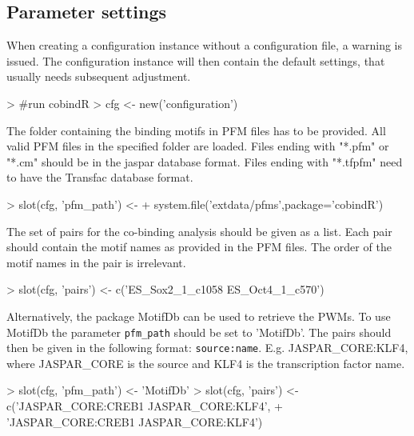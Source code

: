 \documentclass{article}
\begin{document}
\subsection*{Parameter settings}
When creating a configuration instance without a configuration file, a warning is issued. The configuration instance will then contain the default settings, that usually needs subsequent adjustment.

\begin{Schunk}
\begin{Sinput}
> #run cobindR
> cfg <- new('configuration')
\end{Sinput}
\end{Schunk}

The folder containing the binding motifs in PFM files has to be provided. All valid PFM files in the specified folder are loaded. Files ending with "*.pfm" or "*.cm" should be in the jaspar database format. Files ending with "*.tfpfm" need to have the Transfac database format.

\begin{Schunk}
\begin{Sinput}
> slot(cfg, 'pfm_path') <- 
+   system.file('extdata/pfms',package='cobindR')
\end{Sinput}
\end{Schunk}

The set of pairs for the co-binding analysis should be given as a list. Each pair should contain the motif names as provided in the PFM files. The order of the motif names in the pair is irrelevant.

\begin{Schunk}
\begin{Sinput}
> slot(cfg, 'pairs') <- c('ES_Sox2_1_c1058 ES_Oct4_1_c570')
\end{Sinput}
\end{Schunk}

Alternatively, the package MotifDb can be used to retrieve the PWMs. To use MotifDb the parameter \texttt{pfm\_path} should be set to 'MotifDb'. The pairs should then be given in the following format:  \texttt{source:name}. E.g. JASPAR\_CORE:KLF4, where JASPAR\_CORE is the source and KLF4 is the transcription factor name.

\begin{Schunk}
\begin{Sinput}
> slot(cfg, 'pfm_path') <- 'MotifDb'
> slot(cfg, 'pairs') <- c('JASPAR_CORE:CREB1 JASPAR_CORE:KLF4',
+ 		'JASPAR_CORE:CREB1 JASPAR_CORE:KLF4')
\end{Sinput}
\end{Schunk}
\end{document}

